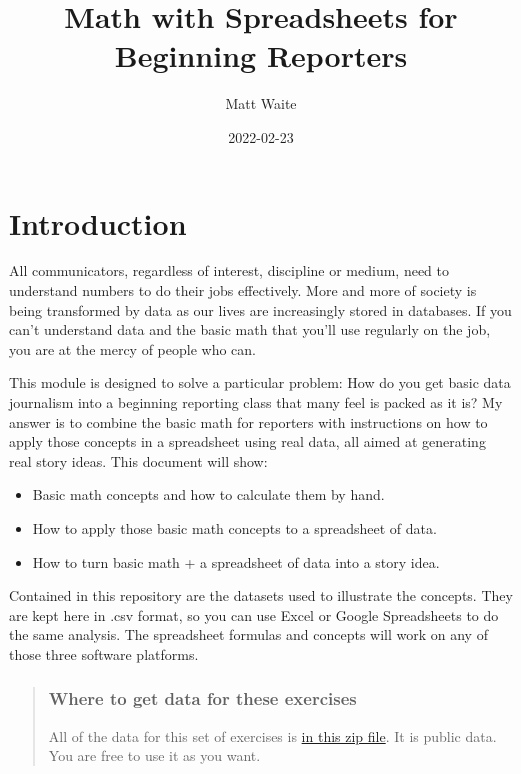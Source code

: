\documentclass[
]{book}
\title{Math with Spreadsheets for Beginning Reporters}
\author{Matt Waite}
\date{2022-02-23}
\providecommand{\tightlist}{%
  \setlength{\itemsep}{0pt}\setlength{\parskip}{0pt}}
\begin{document}
\maketitle

{
\setcounter{tocdepth}{1}
\tableofcontents
}
\hypertarget{introduction}{%
\chapter{Introduction}\label{introduction}}

All communicators, regardless of interest, discipline or medium, need to understand numbers to do their jobs effectively. More and more of society is being transformed by data as our lives are increasingly stored in databases. If you can't understand data and the basic math that you'll use regularly on the job, you are at the mercy of people who can.

This module is designed to solve a particular problem: How do you get basic data journalism into a beginning reporting class that many feel is packed as it is? My answer is to combine the basic math for reporters with instructions on how to apply those concepts in a spreadsheet using real data, all aimed at generating real story ideas. This document will show:

\begin{itemize}
\tightlist
\item
  Basic math concepts and how to calculate them by hand.
\item
  How to apply those basic math concepts to a spreadsheet of data.
\item
  How to turn basic math + a spreadsheet of data into a story idea.
\end{itemize}

Contained in this repository are the datasets used to illustrate the concepts. They are kept here in .csv format, so you can use Excel or Google Spreadsheets to do the same analysis. The spreadsheet formulas and concepts will work on any of those three software platforms.

\begin{quote}
\hypertarget{where-to-get-data-for-these-exercises}{%
\subsection{Where to get data for these exercises}\label{where-to-get-data-for-these-exercises}}

All of the data for this set of exercises is \href{http://mattwaite.github.io/mathanddatafiles/ExerciseData.zip}{in this zip file}. It is public data. You are free to use it as you want.
\end{quote}
\end{document}
